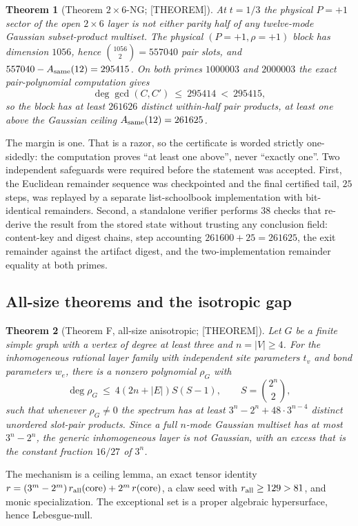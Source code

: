 \documentclass[11pt]{article}
\newtheorem{theorem}{Theorem}[section]
\theoremstyle{definition}
\begin{document}
\begin{theorem}[Theorem $2\times6$-NG; {[THEOREM]}]\label{thm:2x6}
At $t=1/3$ the physical $P=+1$ sector of the open $2\times6$ layer is not either parity half of any
twelve-mode Gaussian subset-product multiset. The physical $(P=+1,\rho=+1)$ block has dimension
$1056$, hence $\binom{1056}{2}=557040$ pair slots, and $557040-A_{\rm same}(12)=295415$. On both
primes $1000003$ and $2000003$ the exact pair-polynomial computation gives
\[
\deg\gcd(C,C')\ \le\ 295414\ <\ 295415 ,
\]
so the block has at least $261626$ distinct within-half pair products, at least one above the
Gaussian ceiling $A_{\rm same}(12)=261625$.
\end{theorem}

The margin is one. That is a razor, so the certificate is worded strictly one-sidedly: the
computation proves ``at least one above'', never ``exactly one''. Two independent safeguards were
required before the statement was accepted. First, the Euclidean remainder sequence was checkpointed
and the final certified tail, $25$ steps, was replayed by a separate list-schoolbook implementation
with bit-identical remainders. Second, a standalone verifier performs $38$ checks that re-derive the
result from the stored state without trusting any conclusion field: content-key and digest chains,
step accounting $261600+25=261625$, the exit remainder against the artifact digest, and the
two-implementation remainder equality at both primes.

\subsection{All-size theorems and the isotropic gap}\label{sec:allsize}
\begin{theorem}[Theorem F, all-size anisotropic; {[THEOREM]}]\label{thm:F}
Let $G$ be a finite simple graph with a vertex of degree at least three and $n=|V|\ge4$. For the
inhomogeneous rational layer family with independent site parameters $t_v$ and bond parameters
$w_e$, there is a nonzero polynomial $\rho_G$ with
\[
\deg\rho_G\ \le\ 4(2n+|E|)S(S-1),\qquad S=\binom{2^n}{2},
\]
such that whenever $\rho_G\ne0$ the spectrum has at least $3^n-2^n+48\cdot3^{n-4}$ distinct unordered
slot-pair products. Since a full $n$-mode Gaussian multiset has at most $3^n-2^n$, the generic
inhomogeneous layer is not Gaussian, with an excess that is the constant fraction $16/27$ of $3^n$.
\end{theorem}

The mechanism is a ceiling lemma, an exact tensor identity
$r=(3^m-2^m)\,r_{\rm all}(\text{core})+2^m\,r(\text{core})$, a claw seed with
$r_{\rm all}\ge129>81$, and monic specialization. The exceptional set is a proper algebraic
hypersurface, hence Lebesgue-null.
\end{document}
